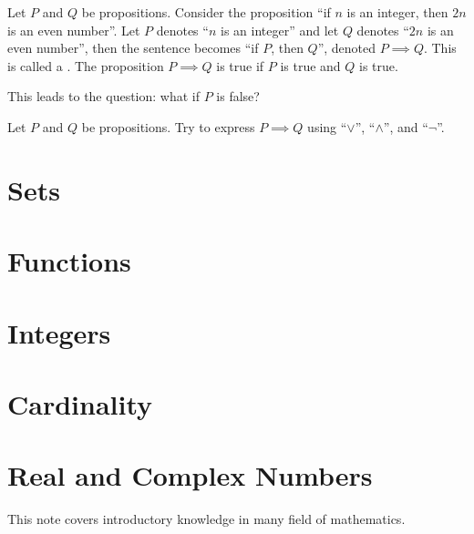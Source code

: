 \documentclass[10pt]{article}
\begin{document}
\par
Let $P$ and $Q$ be propositions. Consider the proposition ``if $n$ is an integer, then $2n$ is an even number''. Let $P$ denotes ``$n$ is an integer'' and let $Q$ denotes ``$2n$ is an even number'', then the sentence becomes ``if $P$, then $Q$'', denoted $P\implies Q$. This is called a . The proposition $P\implies Q$ is true if $P$ is true and $Q$ is true.
\par
This leads to the question: what if $P$ is false? 


\begin{example}
    Let $P$ and $Q$ be propositions. Try to express $P\implies Q$ using ``$\vee$'', ``$\wedge$'', and ``$\neg$''.
\end{example}



\newpage


\section{Sets}


\section{Functions}


\section{Integers}



\section{Cardinality}



\section{Real and Complex Numbers}



This note covers introductory knowledge in many field of mathematics.


\hindex
\end{document}
